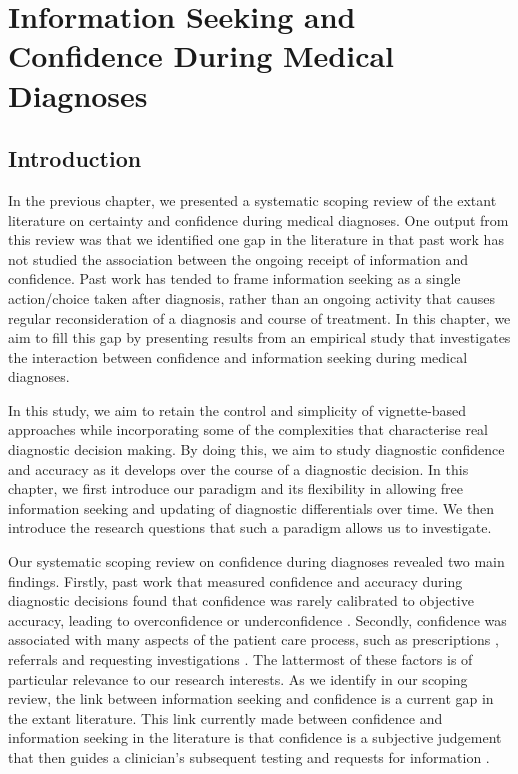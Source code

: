 \documentclass[a4paper, nobind]{templates/ociamthesis}
\begin{document}
\chapter{Information Seeking and Confidence During Medical Diagnoses}\label{chapter-3}

\adjustmtc
{}

\section{Introduction}\label{introduction-1}

In the previous chapter, we presented a systematic scoping review of the extant literature on certainty and confidence during medical diagnoses. One output from this review was that we identified one gap in the literature in that past work has not studied the association between the ongoing receipt of information and confidence. Past work has tended to frame information seeking as a single action/choice taken after diagnosis, rather than an ongoing activity that causes regular reconsideration of a diagnosis and course of treatment. In this chapter, we aim to fill this gap by presenting results from an empirical study that investigates the interaction between confidence and information seeking during medical diagnoses.

\hfill\break
In this study, we aim to retain the control and simplicity of vignette-based approaches while incorporating some of the complexities that characterise real diagnostic decision making. By doing this, we aim to study diagnostic confidence and accuracy as it develops over the course of a diagnostic decision. In this chapter, we first introduce our paradigm and its flexibility in allowing free information seeking and updating of diagnostic differentials over time. We then introduce the research questions that such a paradigm allows us to investigate.

\hfill\break
Our systematic scoping review on confidence during diagnoses revealed two main findings. Firstly, past work that measured confidence and accuracy during diagnostic decisions found that confidence was rarely calibrated to objective accuracy, leading to overconfidence \autocite{friedman_physicians_2005,fernandez-aguilar_use_2022,garbayo_metacognitive_2023} or underconfidence \autocite{mann_relationship_1993,yang_effect_2012,brezis_does_2019}. Secondly, confidence was associated with many aspects of the patient care process, such as prescriptions \autocite{levin_antimicrobial_2012,garbayo_metacognitive_2023}, referrals \autocite{calman_variability_1992} and requesting investigations \autocite{tabak_clinical_1996,gupta_associations_2023}. The lattermost of these factors is of particular relevance to our research interests. As we identify in our scoping review, the link between information seeking and confidence is a current gap in the extant literature. This link currently made between confidence and information seeking in the literature is that confidence is a subjective judgement that then guides a clinician's subsequent testing and requests for information \autocite{tabak_clinical_1996,gupta_associations_2023}.\\
\end{document}

